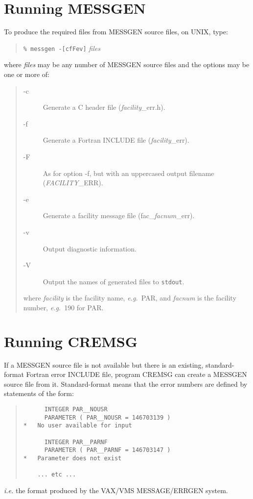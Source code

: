 \section{Running MESSGEN}
To produce the required files from MESSGEN source files, on UNIX, type:
\begin{quote} 
\verb!% messgen -[cfFev]! {\em files}
\end{quote}
where {\em files} may be any number of MESSGEN source files and the options
 may be one or more of:
\begin{quote}
\begin{description}
\item[-c] Generate a C header file ({\em facility}\_err.h).
\item[-f] Generate a Fortran INCLUDE file ({\em facility}\_err).
\item[-F] As for option -f, but with an uppercased output filename
          ({\em FACILITY}\_ERR).
\item[-e] Generate a facility message file (fac\_{\em facnum}\_err).
\item[-v] Output diagnostic information.
\item[-V] Output the names of generated files to {\tt stdout}.
\end{description}
where {\em facility} is the facility name, {\em e.g.}\ PAR, and {\em facnum} is
the facility number, {\em e.g.}\ 190 for PAR.
\end{quote}

\section{Running CREMSG}
If a MESSGEN source file is not available but there is an existing, 
standard-format Fortran error INCLUDE file, program CREMSG can create a MESSGEN
source file from it. Standard-format means that the error numbers are defined
by statements of the form:
\begin{quote} \begin{verbatim}
      INTEGER PAR__NOUSR
      PARAMETER ( PAR__NOUSR = 146703139 )
*   No user available for input
 
      INTEGER PAR__PARNF
      PARAMETER ( PAR__PARNF = 146703147 )
*   Parameter does not exist

    ... etc ...
\end{verbatim} \end{quote}
{\em i.e.} the format produced by the VAX/VMS MESSAGE/ERRGEN system.


